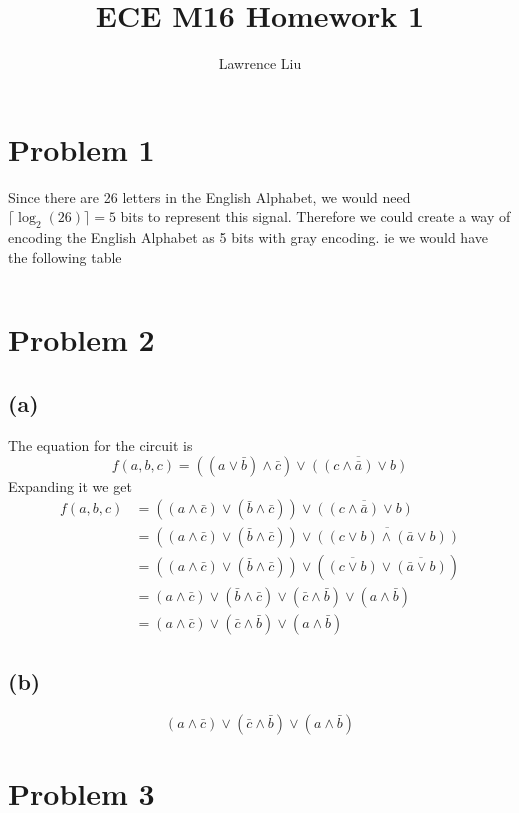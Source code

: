\documentclass[12pt]{article}
\title{ECE M16 Homework 1}
\author{Lawrence Liu}
\begin{document}
\maketitle
\section*{Problem 1}
Since there are 26 letters in the English Alphabet, we would need $\lceil \log_2 (26)\rceil=5$ bits to represent this signal.
Therefore we could create a way of encoding the English Alphabet as 5 bits with gray encoding. ie we would have the following table
\begin{center}
    \begin{tabular}{c|c}
    \end{tabular}
\end{center}
\section*{Problem 2}
\subsection*{(a)}
The equation for the circuit is 
$$f(a,b,c)=((a\vee \bar{b})\wedge\bar{c})\vee\overline{((c\wedge\bar{a})\vee b)}$$
Expanding it we get
\begin{align*}
    f(a,b,c)&=((a\wedge\bar{c})\vee (\bar{b}\wedge\bar{c}))
                \vee\overline{((c\wedge\bar{a})\vee b)}\\
    &=((a\wedge\bar{c})\vee (\bar{b}\wedge\bar{c}))
    \vee\overline{((c\vee b)\wedge(\bar{a}\vee b))}\\
    &=((a\wedge\bar{c})\vee (\bar{b}\wedge\bar{c}))
    \vee(\overline{(c\vee b)}\vee\overline{(\bar{a}\vee b)})\\
    &=(a\wedge\bar{c})\vee (\bar{b}\wedge\bar{c})
    \vee(\bar{c}\wedge \bar{b})\vee(a\wedge\bar{b})\\
    &=\boxed{(a\wedge\bar{c})
    \vee(\bar{c}\wedge \bar{b})\vee(a\wedge\bar{b})}
\end{align*}
\subsection*{(b)}
$$\boxed{(a\wedge\bar{c})
\vee(\bar{c}\wedge \bar{b})\vee(a\wedge\bar{b})}$$
\section*{Problem 3}
\end{document}
